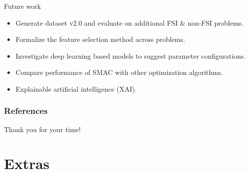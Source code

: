 \documentclass[10pt]{beamer}
\begin{document}
\begin{frame}[t]{Future work}
    
\begin{itemize}
\item Generate dataset v2.0 and evaluate on additional FSI \& non-FSI problems.
\newline
\item Formalize the feature selection method across problems.
\newline
\item Investigate deep learning based models to suggest parameter configurations.
\newline
\item Compare performance of SMAC with other optimization algorithms.
\newline
\item Explainable artificial intelligence (XAI).
\end{itemize}{}
\end{frame}


\begin{frame}[t, allowframebreaks]
\frametitle{References}
\label{lastpage}
\printbibliography[title={References}]
\end{frame}

\begin{frame}
\begin{center}
\Huge Thank you for your time!
\end{center}{}

\end{frame}

\appendix
\section{Extras}
\end{document}
